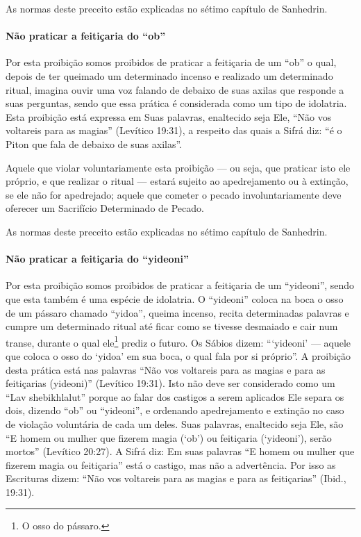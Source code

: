 As normas deste preceito estão explicadas no sétimo capítulo de Sanhedrin.

\paragraph{Não praticar a feitiçaria do ``ob''}

Por esta proibição somos proibidos de praticar a feitiçaria de um ``ob''
o qual, depois de ter queimado um determinado incenso e realizado um
determinado ritual, imagina ouvir uma voz falando de debaixo de suas
axilas que responde a suas perguntas, sendo que essa prática é considerada como um
tipo de idolatria. Esta proibição está expressa em Suas palavras,
enaltecido seja Ele, ``Não vos voltareis para as magias'' (Levítico
19:31), a respeito das quais a Sifrá diz: ``é o Piton que fala de
debaixo de suas axilas''.

Aquele que violar voluntariamente esta proibição --- ou seja, que
praticar isto ele próprio, e que realizar o ritual --- estará sujeito ao
apedrejamento ou à extinção, se ele não for apedrejado; aquele que
cometer o pecado involuntariamente deve oferecer um Sacrifício
Determinado de Pecado.

As normas deste preceito estão explicadas no sétimo capítulo de Sanhedrin.

\paragraph{Não praticar a feitiçaria do ``yideoni''}

Por esta proibição somos proibidos de praticar a feitiçaria de um
``yideoni'', sendo que esta também é uma espécie de idolatria. O
``yideoni'' coloca na boca o osso de um pássaro chamado ``yidoa'',
queima incenso, recita determinadas palavras e cumpre um determinado
ritual até ficar como se tivesse desmaiado e cair num transe, durante o
qual ele\footnote{O osso do pássaro.} prediz o futuro. Os Sábios dizem:
```yideoni' --- aquele que coloca o osso do `yidoa' em sua boca, o qual
fala por si próprio''. A proibição desta prática está nas palavras ``Não
vos voltareis para as magias e para as feitiçarias (yideoni)''
(Levítico 19:31). Isto não deve ser considerado como um ``Lav
shebikhlalut'' porque ao falar dos castigos a serem aplicados Ele separa
os dois, dizendo ``ob'' ou ``yideoni'', e ordenando apedrejamento e
extinção no caso de violação voluntária de cada um deles. Suas palavras,
enaltecido seja Ele, são ``E homem ou mulher que fizerem magia (`ob') ou
feitiçaria (`yideoni'), serão mortos'' (Levítico 20:27). A Sifrá diz: Em
suas palavras ``E homem ou mulher que fizerem magia ou feitiçaria'' está
o castigo, mas não a advertência. Por isso as Escrituras dizem: ``Não
vos voltareis para as magias e para as feitiçarias'' (Ibid., 19:31).

